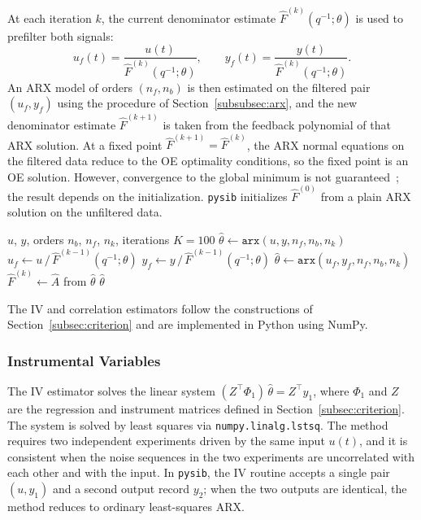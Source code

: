 \documentclass{ifacconf}
\begin{document}
At each iteration $k$, the current denominator estimate
$\hat{F}^{(k)}(q^{-1};\theta)$ is used to prefilter both signals:
\[
  u_f(t) = \frac{u(t)}{\hat{F}^{(k)}(q^{-1};\theta)}, \qquad
  y_f(t) = \frac{y(t)}{\hat{F}^{(k)}(q^{-1};\theta)}.
\]
An ARX model of orders $(n_f, n_b)$ is then estimated on the filtered
pair $(u_f, y_f)$ using the procedure of Section~\ref{subsubsec:arx},
and the new denominator estimate $\hat{F}^{(k+1)}$ is taken from the
feedback polynomial of that ARX solution.
At a fixed point $\hat{F}^{(k+1)} = \hat{F}^{(k)}$, the ARX normal
equations on the filtered data reduce to the OE optimality conditions,
so the fixed point is an OE solution.  However, convergence to the
global minimum is not guaranteed~\cite{ljung1999}; the result depends
on the initialization.  \texttt{pysib} initializes $\hat{F}^{(0)}$
from a plain ARX solution on the unfiltered data.

\begin{algorithm}
\caption{Stieglitz--McBride}
\label{alg:sm}
\begin{algorithmic}[1]
\Require $u$, $y$, orders $n_b$, $n_f$, $n_k$, iterations $K=100$
\State $\hat{\theta} \leftarrow \texttt{arx}(u, y, n_f, n_b, n_k)$
  \State $u_f \leftarrow u \,/\, \hat{F}^{(k-1)}(q^{-1};\theta)$
  \State $y_f \leftarrow y \,/\, \hat{F}^{(k-1)}(q^{-1};\theta)$
  \State $\hat{\theta} \leftarrow \texttt{arx}(u_f, y_f, n_f, n_b, n_k)$
  \State $\hat{F}^{(k)} \leftarrow \hat{A}$ from $\hat{\theta}$
\EndFor
\State \Return $\hat{\theta}$
\end{algorithmic}
\end{algorithm}

The IV and correlation estimators follow the constructions of
Section~\ref{subsec:criterion} and are implemented in Python using
NumPy.

\subsubsection{Instrumental Variables}
\label{subsubsec:iv}

The IV estimator solves the linear system
$(Z^\top\Phi_1)\,\hat\theta = Z^\top y_1$,
where $\Phi_1$ and $Z$ are the regression and instrument matrices
defined in Section~\ref{subsec:criterion}.
The system is solved by least squares via
\texttt{numpy.linalg.lstsq}.
The method requires two independent experiments driven by the same
input $u(t)$, and it is consistent when the noise sequences in the
two experiments are uncorrelated with each other and with the input.
In \texttt{pysib}, the IV routine accepts a single pair
$(u, y_1)$ and a second output record $y_2$; when the two outputs
are identical, the method reduces to ordinary least-squares ARX.
\end{document}
